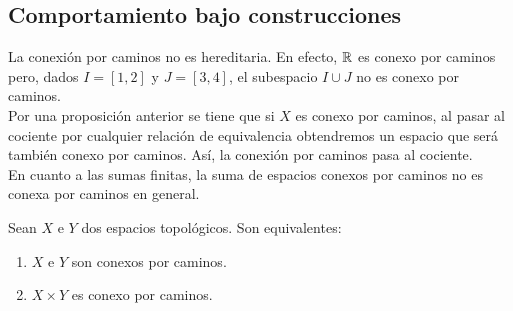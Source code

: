 \subsection{Comportamiento bajo construcciones}
La conexión por caminos no es hereditaria. En efecto, $\displaystyle \mathbb{R} $ es conexo por caminos pero, dados $\displaystyle I = \left[1,2\right]  $ y $\displaystyle J = \left[3,4\right]  $, el subespacio $\displaystyle I \cup J $ no es conexo por caminos. \\

Por una proposición anterior se tiene que si $\displaystyle X $ es conexo por caminos, al pasar al cociente por cualquier relación de equivalencia obtendremos un espacio que será también conexo por caminos. Así, la conexión por caminos pasa al cociente. \\

En cuanto a las sumas finitas, la suma de espacios conexos por caminos no es conexa por caminos en general. %
\begin{prop}
Sean $\displaystyle X $ e $\displaystyle Y $ dos espacios topológicos. Son equivalentes:
\begin{enumerate}
\item $\displaystyle X $ e $\displaystyle Y $ son conexos por caminos.
\item $\displaystyle X \times Y $ es conexo por caminos.
\end{enumerate}
\end{prop}

